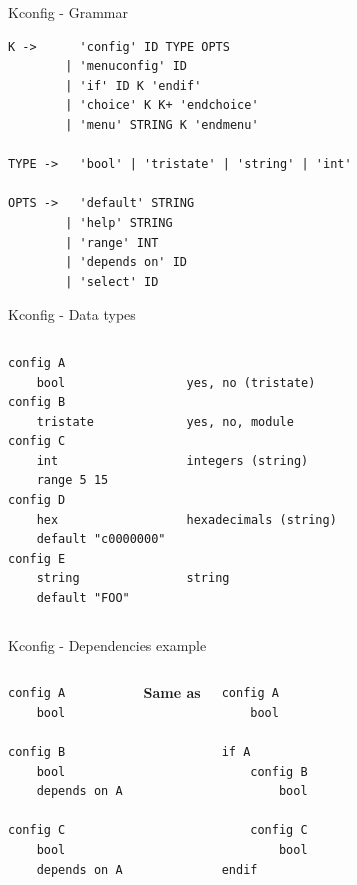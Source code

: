 \documentclass[mathserif,serif]{beamer}
\begin{document}
\begin{frame}[t,fragile]{Kconfig - Grammar}
    \begin{lstlisting}
K ->      'config' ID TYPE OPTS
        | 'menuconfig' ID
        | 'if' ID K 'endif'
        | 'choice' K K+ 'endchoice'
        | 'menu' STRING K 'endmenu'

TYPE ->   'bool' | 'tristate' | 'string' | 'int'

OPTS ->   'default' STRING
        | 'help' STRING
        | 'range' INT
        | 'depends on' ID
        | 'select' ID
    \end{lstlisting}
\end{frame}

\begin{frame}[t,fragile]{Kconfig - Data types}
    \begin{columns}[T]
    \begin{lstlisting}
config A
    bool
config B
    tristate
config C
    int
    range 5 15
config D
    hex
    default "c0000000"
config E
    string
    default "FOO"
    \end{lstlisting}
    \begin{lstlisting}

yes, no (tristate)

yes, no, module

integers (string)


hexadecimals (string)


string
    \end{lstlisting}
    \end{columns}
\end{frame}

\begin{frame}[t,fragile]{Kconfig - Dependencies example}
    \begin{columns}[t]
    \begin{lstlisting}
config A
    bool

config B
    bool
    depends on A

config C
    bool
    depends on A
    \end{lstlisting}

    \textbf{Same as}

    \begin{lstlisting}
config A
    bool

if A
    config B
        bool
    
    config C
        bool
endif
    \end{lstlisting}
    \end{columns}
\end{frame}
\end{document}
